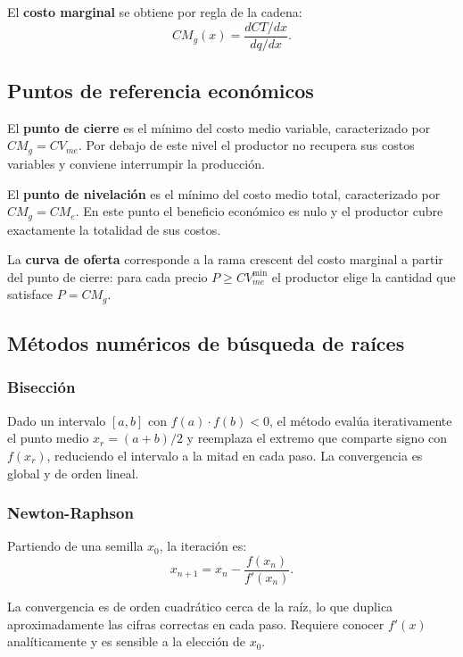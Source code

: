 El \textbf{costo marginal} se obtiene por regla de la cadena:
\begin{equation}
    CM_g(x) = \frac{dCT/dx}{dq/dx}.
\end{equation}

\subsection{Puntos de referencia económicos}

El \textbf{punto de cierre} es el mínimo del costo medio variable, caracterizado por $CM_g = CV_{me}$. Por debajo de este nivel el productor no recupera sus costos variables y conviene interrumpir la producción.

El \textbf{punto de nivelación} es el mínimo del costo medio total, caracterizado por $CM_g = CM_e$. En este punto el beneficio económico es nulo y el productor cubre exactamente la totalidad de sus costos.

La \textbf{curva de oferta} corresponde a la rama crescent del costo marginal a partir del punto de cierre: para cada precio $P \geq CV_{me}^{\min}$ el productor elige la cantidad que satisface $P = CM_g$.

\subsection{Métodos numéricos de búsqueda de raíces}

\subsubsection{Bisección}

Dado un intervalo $[a,b]$ con $f(a)\cdot f(b) < 0$, el método evalúa iterativamente el punto medio $x_r = (a+b)/2$ y reemplaza el extremo que comparte signo con $f(x_r)$, reduciendo el intervalo a la mitad en cada paso. La convergencia es global y de orden lineal.

\subsubsection{Newton-Raphson}

Partiendo de una semilla $x_0$, la iteración es:
\begin{equation}
    x_{n+1} = x_n - \frac{f(x_n)}{f'(x_n)}.
\end{equation}

La convergencia es de orden cuadrático cerca de la raíz, lo que duplica aproximadamente las cifras correctas en cada paso. Requiere conocer $f'(x)$ analíticamente y es sensible a la elección de $x_0$.

